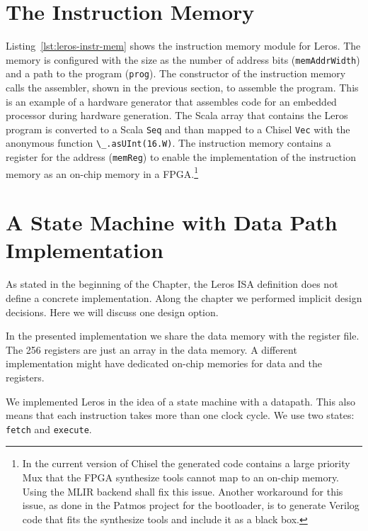 \documentclass[%
    10pt,
    headinclude, footexclude,
    openright, %
    notitlepage,
    cleardoubleempty,
    headsepline,
    pointlessnumbers,
    bibtotoc, idxtotoc,
    ]{scrbook}
\newcommand{\code}[1]{{\lstinline[basicstyle=\small\ttfamily]{#1}}}
\begin{document}



\section{The Instruction Memory}

Listing~\ref{lst:leros-instr-mem} shows the instruction memory module for Leros.
The memory is configured with the size as the number of address bits (\code{memAddrWidth}) and
a path to the program (\code{prog}). The constructor of the instruction memory calls the
assembler, shown in the previous section, to assemble the program.
This is an example of a hardware generator that assembles code for an
embedded processor during hardware generation.
The Scala array that contains the Leros program is converted to a Scala
\code{Seq} and than mapped to a Chisel \code{Vec} with the anonymous
function \code{\_.asUInt(16.W)}.
The instruction memory contains a register for the address (\code{memReg})
to enable the implementation of the instruction memory as an on-chip memory
in a FPGA.\footnote{In the current version of Chisel the generated code
contains a large priority Mux that the FPGA synthesize tools cannot map to
an on-chip memory. Using the MLIR backend shall fix this issue.
Another workaround for this issue, as done in the Patmos project for the
bootloader, is to generate Verilog code that fits the synthesize tools
and include it as a black box.}




\section{A State Machine with Data Path Implementation}

As stated in the beginning of the Chapter, the Leros ISA definition does not define a
concrete implementation. Along the chapter we performed implicit design decisions.
Here we will discuss one design option.

In the presented implementation we share the data memory with the register file.
The 256 registers are just an array in the data memory. A different implementation might
have dedicated on-chip memories for data and the registers.

We implemented Leros in the idea of a state machine with a datapath.
This also means that each instruction takes more than one clock cycle.
We use two states: \code{fetch} and \code{execute}.
\end{document}
